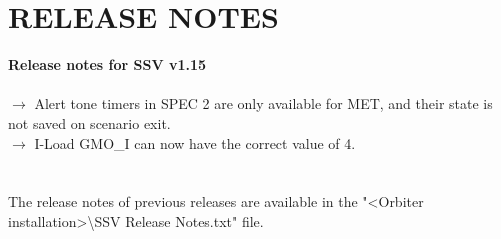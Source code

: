 \documentclass[Space_Shuttle_Vessel_Manual.tex]{subfiles}
\begin{document}
\section{RELEASE NOTES}
\label{sec:release-notes}
\noindent
\textbf{Release notes for SSV v1.15}\\\\
$\rightarrow$ Alert tone timers in SPEC 2 are only available for MET, and their state is not saved on scenario exit.\\
$\rightarrow$ I-Load GMO\_I can now have the correct value of 4.\\
\\
\\
The release notes of previous releases are available in the "<Orbiter installation>\textbackslash SSV Release Notes.txt" file.
\end{document}

